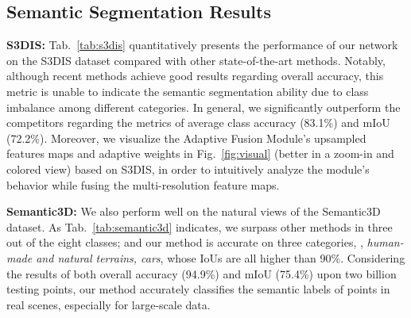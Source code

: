 \documentclass[10pt,twocolumn,letterpaper]{article}
\begin{document}
\subsection{Semantic Segmentation Results}
\noindent \textbf{S3DIS:}
Tab.~\ref{tab:s3dis} quantitatively presents the performance of our network on the S3DIS dataset compared with other state-of-the-art methods. Notably, although recent methods achieve good results regarding overall accuracy, this metric is unable to indicate the semantic segmentation ability due to class imbalance among different categories. In general, we significantly outperform the competitors regarding the metrics of average class accuracy (83.1\%) and mIoU (72.2\%). Moreover, we visualize the Adaptive Fusion Module's upsampled features maps and adaptive weights in Fig.~\ref{fig:visual} (better in a zoom-in and colored view) based on S3DIS, in order to intuitively analyze the module's behavior while fusing the multi-resolution feature maps.  

\vspace{1mm}
\noindent \textbf{Semantic3D:} 
We also perform well on the natural views of the Semantic3D dataset. As Tab.~\ref{tab:semantic3d} indicates, we surpass other methods in three out of the eight classes; and our method is accurate on three categories, \ie, \emph{human-made and natural terrains, cars}, whose IoUs are all higher than 90\%. Considering the results of both overall accuracy (94.9\%) and mIoU (75.4\%) upon two billion testing points, our method accurately classifies the semantic labels of points in real scenes, especially for large-scale data.
\end{document}
